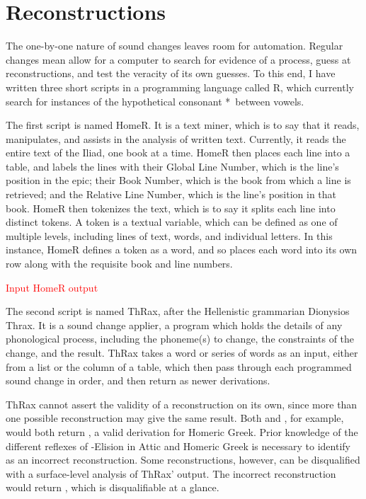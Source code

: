 \section{Reconstructions}\label{sec:Recon}
The one-by-one nature of sound changes leaves room for automation. Regular changes mean allow for a computer to search for evidence of a process, guess at reconstructions, and test the veracity of its own guesses.  To this end, I have written three short scripts in a programming language called R, which currently search for instances of the hypothetical consonant *\w\ between vowels.

The first script is named HomeR. It is a text miner, which is to say that it reads, manipulates, and assists in the analysis of written text. Currently, it reads the entire text of the Iliad, one book at a time. HomeR then places each line into a table, and labels the lines with their Global Line Number, which is the line's position in the epic; their Book Number, which is the book from which a line is retrieved; and the Relative Line Number, which is the line's position in that book. HomeR then tokenizes the text, which is to say it splits each line into distinct tokens. A token is a textual variable, which can be defined as one of multiple levels, including lines of text, words, and individual letters. In this instance, HomeR defines a token as a word, and so places each word into its own row along with the requisite book and line numbers.

\noindent\textcolor{red}{Input HomeR output}


The second script is named ThRax, after the Hellenistic grammarian Dionysios Thrax. It is a sound change applier, a program which holds the details of any phonological process, including the phoneme(s) to change, the constraints of the change, and the result. ThRax takes a word or series of words as an input, either from a list or the column of a table, which then pass through each programmed sound change in order, and then return as newer derivations. 

ThRax cannot assert the validity of a reconstruction on its own, since more than one possible reconstruction may give the same result. Both  and , for example, would both return , a valid derivation for Homeric Greek. Prior knowledge of the different reflexes of \W-Elision in Attic and Homeric Greek is necessary to identify  as an incorrect reconstruction. Some reconstructions, however, can be disqualified with a surface-level analysis of ThRax' output. The incorrect reconstruction  would return , which is disqualifiable at a glance.

